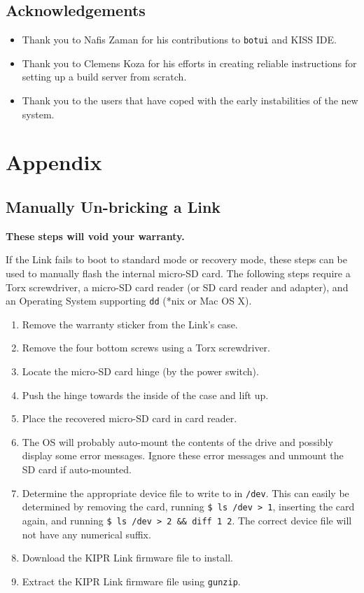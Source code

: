 \documentclass[12pt,letterpaper]{article}
\begin{document}
	
	\subsection{Acknowledgements}
	\begin{itemize}
		\setlength{\itemsep}{0em}
		\item Thank you to Nafis Zaman for his contributions to \texttt{botui} and KISS IDE.
		\item Thank you to Clemens Koza for his efforts in creating reliable instructions for setting up a build server from scratch.
		\item Thank you to the users that have coped with the early instabilities of the new system.
	\end{itemize}

	
	\section{Appendix}
	
	\subsection{Manually Un-bricking a Link}
	\noindent \textbf{These steps will void your warranty.}
	
	\noindent If the Link fails to boot to standard mode or recovery mode, these steps can be used to manually flash the internal micro-SD card. The following steps require a Torx screwdriver, a micro-SD card reader (or SD card reader and adapter), and an Operating System supporting \texttt{dd} (*nix or Mac OS X).
	
	\begin{enumerate}
		\setlength{\itemsep}{0em}
		\item Remove the warranty sticker from the Link's case.
		\item Remove the four bottom screws using a Torx screwdriver.
		\item Locate the micro-SD card hinge (by the power switch).
		\item Push the hinge towards the inside of the case and lift up.
		\item Place the recovered micro-SD card in card reader.
		\item The OS will probably auto-mount the contents of the drive and
		possibly display some error messages. Ignore these error messages and
		unmount the SD card if auto-mounted.
		\item Determine the appropriate device file to write to in \texttt{/dev}.
		This can easily be determined by removing the card,
		running \texttt{\$ ls /dev > 1}, inserting the card again, 
		and running \texttt{\$ ls /dev > 2 \&\& diff 1 2}. The correct
		device file will not have any numerical suffix.
		\item Download the KIPR Link firmware file to install.
		\item Extract the KIPR Link firmware file using \texttt{gunzip}.
	\end{enumerate}
	
\end{document}
